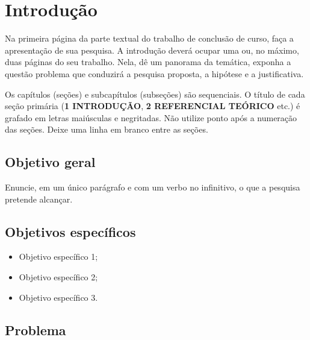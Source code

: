 
\section{Introdução}

Na primeira página da parte textual do trabalho de conclusão de curso, faça a
apresentação de sua pesquisa. A introdução deverá ocupar uma ou, no máximo, duas
páginas do seu trabalho. Nela, dê um panorama da temática, exponha a questão
problema que conduzirá a pesquisa proposta, a hipótese e a justificativa.

Os capítulos (seções) e subcapítulos (subseções) são sequenciais. O título de
cada seção primária (\textbf{1 INTRODUÇÃO}, \textbf{2 REFERENCIAL TEÓRICO} etc.)
é grafado em letras maiúsculas e negritadas. Não utilize ponto após a numeração
das seções. Deixe uma linha em branco entre as seções.

\subsection{Objetivo geral}

Enuncie, em um único parágrafo e com um verbo no infinitivo, o que a pesquisa
pretende alcançar.

\subsection{Objetivos específicos}

\begin{itemize}
  \item Objetivo específico 1;
  \item Objetivo específico 2;
  \item Objetivo específico 3.
\end{itemize}

\subsection{Problema}

